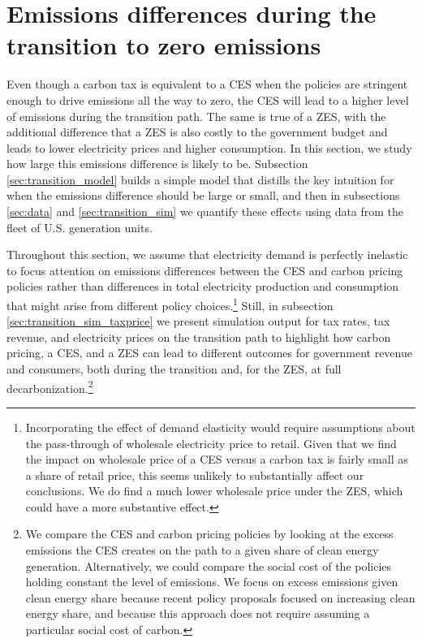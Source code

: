 \documentclass[12pt]{article}
\begin{document}
\section{Emissions differences during the transition to zero emissions}\label{sec:emissionsdiffs}

Even though a carbon tax is equivalent to a CES when the policies are stringent enough to drive emissions all the way to zero, the CES will lead to a higher level of emissions during the transition path. The same is true of a ZES, with the additional difference that a ZES is also costly to the government budget and leads to lower electricity prices and higher consumption. In this section, we study how large this emissions difference is likely to be. Subsection \ref{sec:transition_model} builds a simple model that distills the key intuition for when the emissions difference should be large or small, and then in subsections \ref{sec:data} and \ref{sec:transition_sim} we quantify these effects using data from the fleet of U.S. generation units. 

Throughout this section, we assume that electricity demand is perfectly inelastic to focus attention on emissions differences between the CES and carbon pricing policies rather than differences in total electricity production and consumption that might arise from different policy choices.\footnote{Incorporating the effect of demand elasticity would require assumptions about the pass-through of wholesale electricity price to retail. Given that we find the impact on wholesale price of a CES versus a carbon tax is fairly small as a share of retail price, this seems unlikely to substantially affect our conclusions. We do find a much lower wholesale price under the ZES, which could have a more substantive effect.} Still, in  subsection \ref{sec:transition_sim_taxprice} we present simulation output for tax rates, tax revenue, and electricity prices on the transition path to highlight how carbon pricing, a CES, and a ZES can lead to different outcomes for government revenue and consumers, both during the transition and, for the ZES, at full decarbonization.\footnote{We compare the CES and carbon pricing policies by looking at the excess emissions the CES creates on the path to a given share of clean energy generation. Alternatively, we could compare the social cost of the policies holding constant the level of emissions.  We focus on excess emissions given clean energy share because recent policy proposals focused on increasing clean energy share, and because this approach does not require assuming a particular social cost of carbon.}
\end{document}
